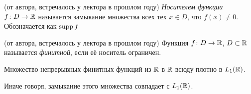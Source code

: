 \begin{definition} (от автора, встречалось у лектора в прошлом году)
	\textit{Носителем функции} $f \colon D \to \mathbb{R}$ называется замыкание множества всех тех $x \in D$, что $f(x) \neq 0$. Обозначается как $\operatorname{supp} f$
\end{definition}

\begin{definition} (от автора, встречалось у лектора в прошлом году)
	Функция $f \colon D \to \mathbb{R}$, $D \subset \mathbb{R}$ называется \textit{финитной}, если её носитель ограничен.
\end{definition}

\begin{lemma}
	Множество непрерывных финитных функций из $\mathbb{R}$ в $\mathbb{R}$ всюду плотно в $L_1(\mathbb{R})$.
\end{lemma}

\begin{note}
	Иначе говоря, замыкание этого множества совпадает с $L_1(\mathbb{R})$.
\end{note}

